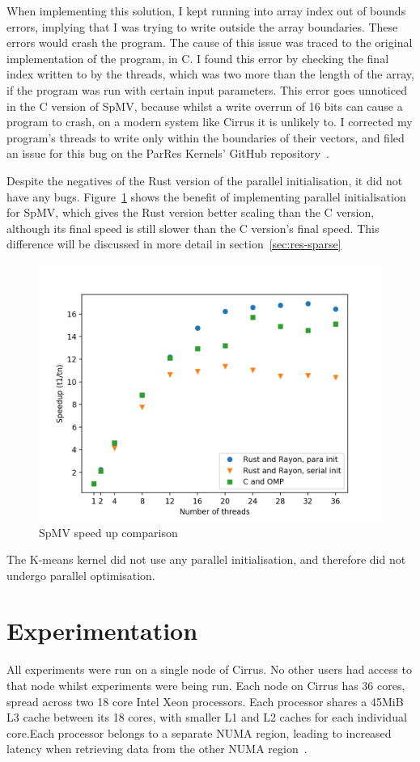 When implementing this solution, I kept running into array index out of bounds errors, implying that I was trying to write outside the array boundaries. These errors would crash the program. The cause of this issue was traced to the original implementation of the program, in C. I found this error by checking the final index written to by the threads, which was two more than the length of the array, if the program was run with certain input parameters. This error goes unnoticed in the C version of SpMV, because whilst a write overrun of 16 bits can cause a program to crash, on a modern system like Cirrus it is unlikely to. I corrected my program's threads to write only within the boundaries of their vectors, and filed an issue for this bug on the ParRes Kernels' GitHub repository~\cite{SparseBug}.

Despite the negatives of the Rust version of the parallel initialisation, it did not have any bugs. Figure~\ref{fig:sparse-speedup} shows the benefit of implementing parallel initialisation for SpMV, which gives the Rust version better scaling than the C version, although its final speed is still slower than the C version's final speed. This difference will be discussed in more detail in section~\ref{sec:res-sparse}

\begin{figure}[H]
    \centering
    \includegraphics[width=.8\linewidth]{figs/sparse/speedup.png}
    \caption{SpMV speed up comparison}
    \label{fig:sparse-speedup}
\end{figure}

The K-means kernel did not use any parallel initialisation, and therefore did not undergo parallel optimisation.

\section{Experimentation}
All experiments were run on a single node of Cirrus. No other users had access to that node whilst experiments were being run. Each node on Cirrus has 36 cores, spread across two 18 core Intel Xeon processors. Each processor shares a 45MiB L3 cache between its 18 cores, with smaller L1 and L2 caches for each individual core.Each processor belongs to a separate NUMA region, leading to increased latency when retrieving data from the other NUMA region~\cite{CirrusHardware}.

